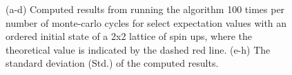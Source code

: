 \documentclass[10pt,showpacs,preprintnumbers,amsmath,amssymb,nofootinbib,aps,prl,twocolumn,groupedaddress,superscriptaddress,showkeys]{revtex4-1}
\begin{document}
\begin{figure}[h!p]
{    }
    \caption{(a-d) Computed results from running the algorithm 100 times per number of monte-carlo cycles for select expectation values with an ordered initial state of a 2x2 lattice of spin ups, where the theoretical value is indicated by the dashed red line. (e-h) The standard deviation (Std.) of the computed results.}
    \label{fig:convergence 2x2} 
  \end{figure}
\end{document}
